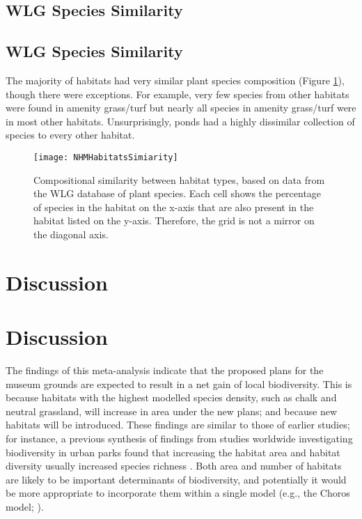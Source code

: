 \subsection{WLG Species Similarity}%
\else
\subsection*{WLG Species Similarity}
\fi
The majority of habitats had very similar plant species composition (Figure \ref{fig:wlgsimilarity}), though there were exceptions. For example, very few species from other habitats were found in amenity grass/turf but nearly all species in amenity grass/turf were in most other habitats. Unsurprisingly, ponds had a highly dissimilar collection of species to every other habitat.


\begin{figure}[t]
	\centering
	\texttt{[image: NHMHabitatsSimiarity]}
	\caption{Compositional similarity between habitat types, based on data from the WLG database of plant species. Each cell shows the percentage of species in the habitat on the x-axis that are also present in the habitat listed on the y-axis. Therefore, the grid is not a mirror on the diagonal axis.}
   	 \label{fig:wlgsimilarity}
\end{figure}

\ifappendixStyle %
\section{Discussion}%
\else
\section*{Discussion}
\fi

The findings of this meta-analysis indicate that the proposed plans for the museum grounds are expected to result in a net gain of local biodiversity. This is because habitats with the highest modelled species density, such as chalk and neutral grassland, will increase in area under the new plans; and because new habitats will be introduced. These findings are similar to those of earlier studies; for instance, a previous synthesis of findings from studies worldwide investigating biodiversity in urban parks found that increasing the habitat area and habitat diversity usually increased species richness \citep{Nielsen:2014ue}. Both area and number of habitats are likely to be important determinants of biodiversity, and potentially it would be more appropriate to incorporate them within a single model (e.g., the Choros model; \citealt{Triantis:2003jb}).

